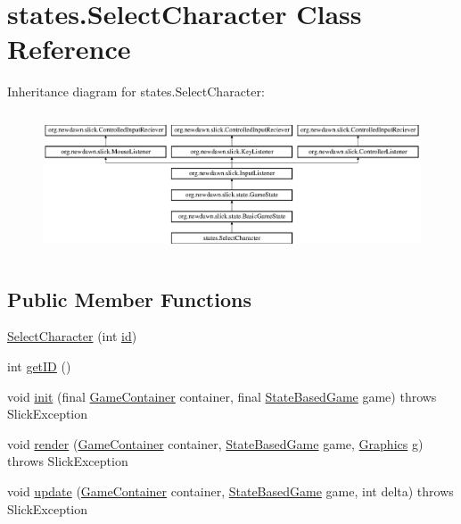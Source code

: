 \hypertarget{classstates_1_1_select_character}{}\section{states.\+Select\+Character Class Reference}
\label{classstates_1_1_select_character}
Inheritance diagram for states.\+Select\+Character\+:\begin{figure}[H]
\begin{center}
\leavevmode
\includegraphics[height=4.226415cm]{classstates_1_1_select_character}
\end{center}
\end{figure}
\subsection*{Public Member Functions}
\begin{DoxyCompactItemize}
\item 
\mbox{\hyperlink{classstates_1_1_select_character_a9062e830d534afc91e4f79940aed82b9}{Select\+Character}} (int \mbox{\hyperlink{classstates_1_1_select_character_a5c1f6e40502826b9d1b8ece9e66f08a5}{id}})
\item 
int \mbox{\hyperlink{classstates_1_1_select_character_a06b40374019fef5b3f3f88be6a3a8686}{get\+ID}} ()
\item 
void \mbox{\hyperlink{classstates_1_1_select_character_af65a8be402fe3506397f096d75a8adf2}{init}} (final \mbox{\hyperlink{classorg_1_1newdawn_1_1slick_1_1_game_container}{Game\+Container}} container, final \mbox{\hyperlink{classorg_1_1newdawn_1_1slick_1_1state_1_1_state_based_game}{State\+Based\+Game}} game)  throws Slick\+Exception 
\item 
void \mbox{\hyperlink{classstates_1_1_select_character_a665bedb1393a574746edaafd0835775e}{render}} (\mbox{\hyperlink{classorg_1_1newdawn_1_1slick_1_1_game_container}{Game\+Container}} container, \mbox{\hyperlink{classorg_1_1newdawn_1_1slick_1_1state_1_1_state_based_game}{State\+Based\+Game}} game, \mbox{\hyperlink{classorg_1_1newdawn_1_1slick_1_1_graphics}{Graphics}} g)  throws Slick\+Exception 
\item 
void \mbox{\hyperlink{classstates_1_1_select_character_a195f11a8a0d64fb19d044a1535db7629}{update}} (\mbox{\hyperlink{classorg_1_1newdawn_1_1slick_1_1_game_container}{Game\+Container}} container, \mbox{\hyperlink{classorg_1_1newdawn_1_1slick_1_1state_1_1_state_based_game}{State\+Based\+Game}} game, int delta)  throws Slick\+Exception 
\end{DoxyCompactItemize}
